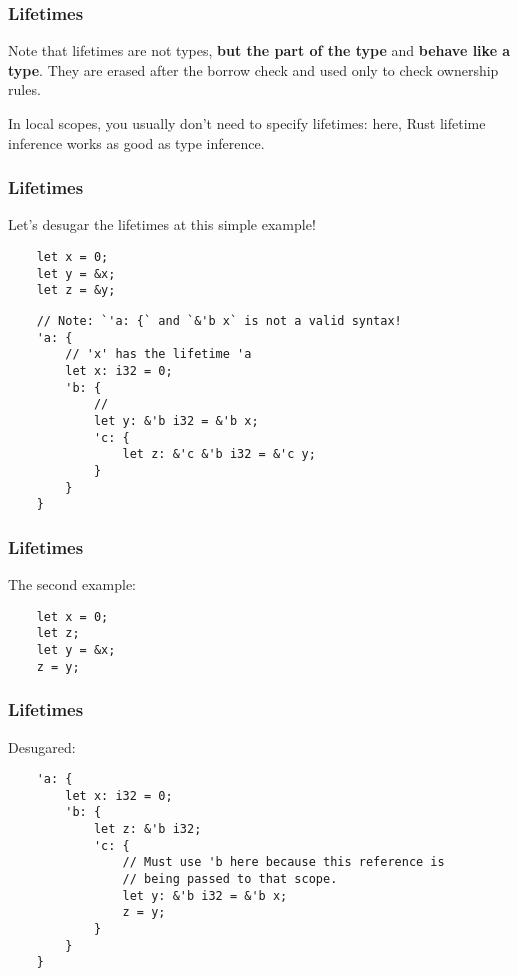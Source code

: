 \documentclass[aspectratio=1610,t]{beamer}
\begin{document}

\begin{frame}[fragile]
\frametitle{Lifetimes}
Note that lifetimes are not types, \textbf{but the part of the type} and \textbf{behave like a type}. They are erased after the borrow check and used only to check ownership rules.

In local scopes, you usually don't need to specify lifetimes: here, Rust lifetime inference works as good as type inference.
\end{frame}


\begin{frame}[fragile]
\frametitle{Lifetimes}
Let's desugar the lifetimes at this simple example!

\begin{verbatim}
    let x = 0;
    let y = &x;
    let z = &y;
\end{verbatim}

\begin{verbatim}
    // Note: `'a: {` and `&'b x` is not a valid syntax!
    'a: {
        // 'x' has the lifetime 'a
        let x: i32 = 0;
        'b: {
            //
            let y: &'b i32 = &'b x;
            'c: {
                let z: &'c &'b i32 = &'c y;
            }
        }
    }
\end{verbatim}
\end{frame}


\begin{frame}[fragile]
\frametitle{Lifetimes}
The second example:

\begin{verbatim}
    let x = 0;
    let z;
    let y = &x;
    z = y;
\end{verbatim}
\end{frame}


\begin{frame}[fragile]
\frametitle{Lifetimes}
Desugared:

\begin{verbatim}
    'a: {
        let x: i32 = 0;
        'b: {
            let z: &'b i32;
            'c: {
                // Must use 'b here because this reference is
                // being passed to that scope.
                let y: &'b i32 = &'b x;
                z = y;
            }
        }
    }
\end{verbatim}
\end{frame}
\end{document}
